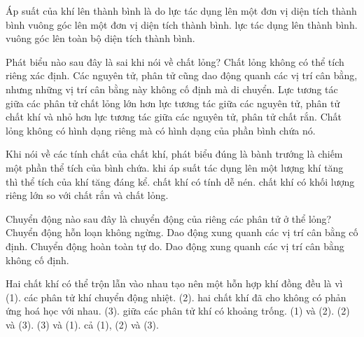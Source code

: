 \begin{ex}
Áp suất của khí lên thành bình là do lực tác dụng
\choice
{lên một đơn vị diện tích thành bình}
{\True vuông góc lên một đơn vị diện tích thành bình.}
{lực tác dụng lên thành bình.}
{vuông góc lên toàn bộ diện tích thành bình.}
\end{ex}

\begin{ex}
Phát biểu nào sau đây là sai khi nói về chất lỏng?
\choice
{\True Chất lỏng không có thể tích riêng xác định.}
{Các nguyên tử, phân tử cũng dao động quanh các vị trí cân bằng, nhưng những vị trí cân bằng này không cố định mà di chuyển.}
{Lực tương tác giữa các phân tử chất lỏng lớn hơn lực tương tác giữa các nguyên tử, phân tử chất khí và nhỏ hơn lực tương tác giữa các nguyên tử, phân tử chất rắn.}
{Chất lỏng không có hình dạng riêng mà có hình dạng của phần bình chứa nó.}
\end{ex}

\begin{ex}
Khi nói về các tính chất của chất khí, phát biểu đúng là
\choice
{bành trướng là chiếm một phần thể tích của bình chứa.}
{khi áp suất tác dụng lên một lượng khí tăng thì thể tích của khí tăng đáng kể.}
{\True chất khí có tính dễ nén.}
{chất khí có khối lượng riêng lớn so với chất rắn và chất lỏng.}
\end{ex}

\begin{ex}
Chuyển động nào sau đây là chuyển động của riêng các phân tử ở thể lỏng?
\choice
{Chuyển động hỗn loạn không ngừng.}
{Dao động xung quanh các vị trí cân bằng cố định.}
{Chuyển động hoàn toàn tự do.}
{\True Dao động xung quanh các vị trí cân bằng không cố định.}
\end{ex}


\begin{ex}
Hai chất khí có thể trộn lẫn vào nhau tạo nên một hỗn hợp khí đồng đều là vì
(1). các phân tử khí chuyển động nhiệt.
(2). hai chất khí đã cho không có phản ứng hoá học với nhau.
(3). giữa các phân tử khí có khoảng trống.
\choice
{(1) và (2).}
{(2) và (3).}
{(3) và (1).}
{\True cả (1), (2) và (3).}
\end{ex}


